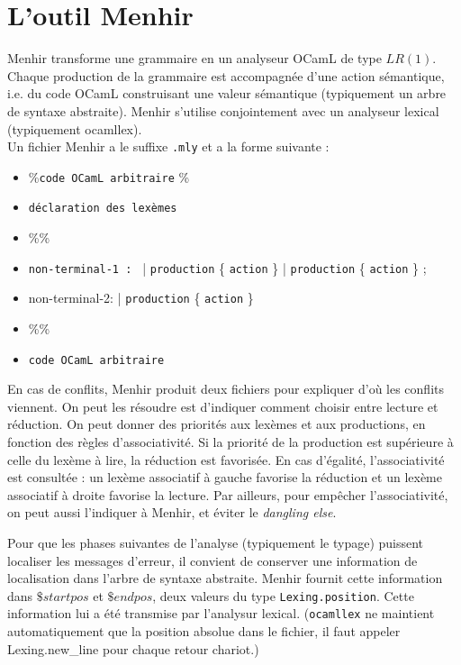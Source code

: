 \documentclass{cours}
\begin{document}
\section{L'outil Menhir}
Menhir transforme une grammaire en un analyseur OCamL de type $LR(1)$. Chaque production de la grammaire est accompagnée d'une action sémantique, i.e. du code OCamL construisant une valeur sémantique (typiquement un arbre de syntaxe abstraite). Menhir s'utilise conjointement avec un analyseur lexical (typiquement \textrm{ocamllex}).\\
Un fichier Menhir a le suffixe \texttt{.mly} et a la forme suivante : 
\begin{itemize}
    \item \%{\texttt{code OCamL arbitraire} \%}
    \item \texttt{déclaration des lexèmes}
    \item \%\%
    \item \texttt{non-terminal-1 : }
    | \texttt{production} \{ \texttt{action} \}
    | \texttt{production} \{ \texttt{action} \}
    ;
    \item non-terminal-2:
    | \texttt{production} \{ \texttt{action} \}
    \item \%\%
    \item \texttt{code OCamL arbitraire}
\end{itemize}
En cas de conflits, Menhir produit deux fichiers pour expliquer d'où les conflits viennent. On peut les résoudre est d'indiquer comment choisir entre lecture et réduction. On peut donner des priorités aux lexèmes et aux productions, en fonction des règles d'associativité. Si la priorité de la production est supérieure à celle du lexème à lire, la réduction est favorisée. En cas d'égalité, l'associativité est consultée : un lexème associatif à gauche favorise la réduction et un lexème associatif à droite favorise la lecture. Par ailleurs, pour empêcher l'associativité, on peut aussi l'indiquer à Menhir, et éviter le \textit{dangling else}.

Pour que les phases suivantes de l'analyse (typiquement le typage) puissent localiser les messages d'erreur, il convient de conserver une information de localisation dans l'arbre de syntaxe abstraite. Menhir fournit cette information dans $\$startpos$ et $\$endpos$, deux valeurs du type \texttt{Lexing.position}. Cette information lui a été transmise par l'analysur lexical. (\texttt{ocamllex} ne maintient automatiquement que la position absolue dans le fichier, il faut appeler Lexing.new\_line pour chaque retour chariot.)
\end{document}

